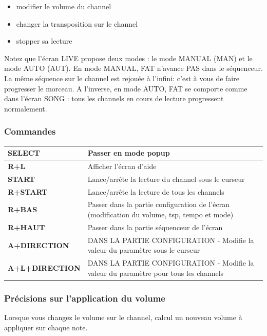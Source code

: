\documentclass[12pt,a4paper]{article}
\begin{document}
    \begin{itemize}
        \item{modifier le volume du channel}
        \item{changer la transposition sur le channel}
        \item{stopper sa lecture}
    \end{itemize}
    \medskip

    Notez que l'écran LIVE propose deux modes : le mode MANUAL (MAN) et le mode AUTO (AUT).
    En mode MANUAL, FAT n'avance PAS dans le séquenceur. La même séquence sur le channel est rejouée à l'infini: c'est à vous de faire progresser le morceau.
    A l'inverse, en mode AUTO, FAT se comporte comme dans l'écran SONG : tous les channels en cours de lecture progressent normalement.
    \newpage %
    \subsubsection{Commandes}
    \begin{supertabular}{|l|p{10cm}|}
        \hline
        {\bf SELECT} & Passer en mode popup \\
        \hline
        {\bf R+L} & Afficher l'écran d'aide \\
        \hline
        {\bf START} & Lance/arrête la lecture du channel sous le curseur \\
        \hline
        {\bf R+START} & Lance/arrête la lecture de tous les channels \\
        \hline
        {\bf R+BAS} & Passer dans la partie configuration de l'écran (modification du volume, tsp, tempo et mode) \\
        \hline
        {\bf R+HAUT} & Passer dans la partie séquenceur de l'écran \\
        \hline
        {\bf A+DIRECTION} & DANS LA PARTIE CONFIGURATION - Modifie la valeur du paramètre sous le curseur \\
        \hline
        {\bf A+L+DIRECTION} & DANS LA PARTIE CONFIGURATION - Modifie la valeur du paramètre pour tous les channels \\
        \hline
    \end{supertabular}

    \subsubsection{Précisions sur l'application du volume}

    Lorsque vous changez le volume sur le channel, \FAT calcul un nouveau volume à appliquer sur chaque note.
    \medskip
\end{document}
